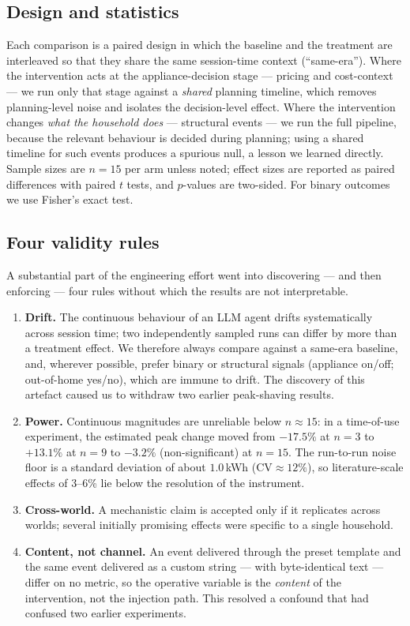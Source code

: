 \documentclass[11pt]{article}
\begin{document}
\subsection{Design and statistics}
Each comparison is a paired design in which the baseline and the treatment are interleaved so that they
share the same session-time context (``same-era''). Where the intervention acts at the
appliance-decision stage --- pricing and cost-context --- we run only that stage against a \emph{shared}
planning timeline, which removes planning-level noise and isolates the decision-level effect. Where the
intervention changes \emph{what the household does} --- structural events --- we run the full pipeline,
because the relevant behaviour is decided during planning; using a shared timeline for such events
produces a spurious null, a lesson we learned directly. Sample sizes are $n=15$ per arm unless noted;
effect sizes are reported as paired differences with paired $t$ tests, and $p$-values are two-sided. For
binary outcomes we use Fisher's exact test.

\subsection{Four validity rules}
A substantial part of the engineering effort went into discovering --- and then enforcing --- four rules
without which the results are not interpretable.
\begin{enumerate}
\item \textbf{Drift.} The continuous behaviour of an LLM agent drifts systematically across session time;
two independently sampled runs can differ by more than a treatment effect. We therefore always compare
against a same-era baseline, and, wherever possible, prefer binary or structural signals (appliance
on/off; out-of-home yes/no), which are immune to drift. The discovery of this artefact caused us to
withdraw two earlier peak-shaving results.
\item \textbf{Power.} Continuous magnitudes are unreliable below $n\approx15$: in a time-of-use
experiment, the estimated peak change moved from $-17.5\%$ at $n=3$ to $+13.1\%$ at $n=9$ to $-3.2\%$
(non-significant) at $n=15$. The run-to-run noise floor is a standard deviation of about $1.0$\,kWh
($\mathrm{CV}\approx12\%$), so literature-scale effects of 3--6\% lie below the resolution of the
instrument.
\item \textbf{Cross-world.} A mechanistic claim is accepted only if it replicates across worlds; several
initially promising effects were specific to a single household.
\item \textbf{Content, not channel.} An event delivered through the preset template and the same event
delivered as a custom string --- with byte-identical text --- differ on no metric, so the operative
variable is the \emph{content} of the intervention, not the injection path. This resolved a confound that
had confused two earlier experiments.
\end{enumerate}
\end{document}
